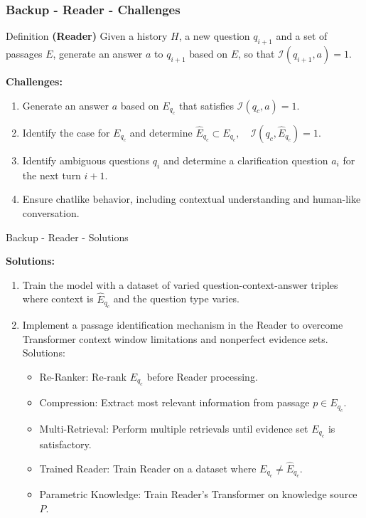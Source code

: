 \documentclass{beamer}
\begin{document}
\begin{frame}
  \frametitle{Backup - Reader - Challenges}

  \begin{block}{Definition}
    \textbf{(Reader)} Given a history $H$, a new question $q_{i+1}$ and a set of passages $E$, generate an answer $a$ to $q_{i+1}$ based on $E$, so that $\mathcal{I}(q_{i+1},a) = 1$.
  \end{block}

  \textbf{Challenges:}

  \begin{enumerate}
    \item Generate an answer $a$ based on $E_{q_c}$ that satisfies $\mathcal{I}(q_c, a) = 1$.
    \item Identify the case for $E_{q_c}$ and determine $\hat{E}_{q_c} \subset E_{q_c}, \quad \mathcal{I}(q_c, \hat{E}_{q_c}) = 1$.
    \item Identify ambiguous questions $q_{i}$ and determine a clarification question $a_{i}$ for the next turn $i+1$.
    \item Ensure chatlike behavior, including contextual understanding and human-like conversation.
  \end{enumerate}

\end{frame}

\begin{frame}{Backup - Reader - Solutions}

  \textbf{Solutions:}

  \begin{enumerate}
    \item Train the model with a dataset of varied question-context-answer triples where context is $\hat{E}_{q_c}$ and the question type varies.
    \item Implement a passage identification mechanism in the Reader to overcome Transformer context window limitations and nonperfect evidence sets. Solutions:
      \begin{itemize}
          \item Re-Ranker: Re-rank $E_{q_c}$ before Reader processing.
          \item Compression: Extract most relevant information from passage $p \in E_{q_c}$.
          \item Multi-Retrieval: Perform multiple retrievals until evidence set $E_{q_c}$ is satisfactory.
          \item Trained Reader: Train Reader on a dataset where $E_{q_c} \not= \hat{E}_{q_c}$.
          \item Parametric Knowledge: Train Reader's Transformer on knowledge source $P$.
      \end{itemize}
  \end{enumerate}
  
\end{frame}
\end{document}

